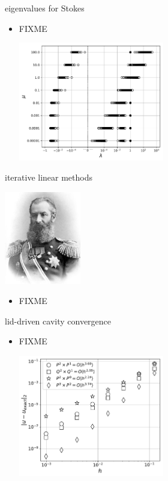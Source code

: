 \documentclass[10pt,hyperref,dvipsnames]{beamer}
\begin{document}
\begin{frame}{eigenvalues for Stokes}

\begin{itemize}
\item FIXME
\begin{center}
\includegraphics[width=0.5\textwidth]{figs/stokesmueigs.pdf}
\end{center}
\end{itemize}
\end{frame}


\begin{frame}{iterative linear methods}

\hfill \includegraphics[width=0.25\textwidth]{figs/people/akrylov.jpg}

\vspace{-20mm}
\begin{itemize}
\item FIXME
\end{itemize}
\end{frame}


\begin{frame}{lid-driven cavity convergence}

\begin{itemize}
\item FIXME
\begin{center}
\includegraphics[width=0.5\textwidth]{figs/stokesconv-uerr.pdf}
\end{center}
\end{itemize}
\end{frame}
\end{document}
